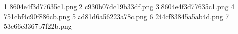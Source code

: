 1 8604e4f3d77635c1.png
2 c930b07dc19b33df.png
3 8604e4f3d77635c1.png
4 751cbf4c90f886cb.png
5 ad81d6a56223a78c.png
6 244cf83845a5ab4d.png
7 53e66c3367b7f22b.png
